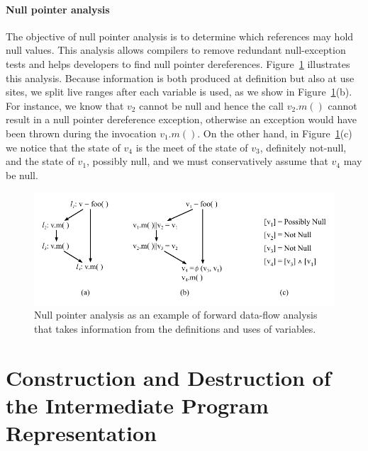 \paragraph{Null pointer analysis} The objective of null pointer analysis is to determine which references may hold null values.
This analysis allows compilers to remove redundant null-exception tests and helps developers to find null pointer dereferences.
Figure~\ref{fig:ssi:nullAnalysis} illustrates this analysis.
Because information is both produced at definition but also at use sites, we split live ranges after each variable is used, as we show in Figure~\ref{fig:ssi:nullAnalysis}(b).
For instance, we know that $v_2$ cannot be null and hence the call $v_2.m()$ cannot result in a null pointer dereference exception, otherwise an exception would have been thrown during the invocation $v_1.m()$.
On the other hand, in Figure~\ref{fig:ssi:nullAnalysis}(c) we notice that the state of $v_4$ is the meet of the state of $v_3$, definitely not-null, and the state of $v_1$, possibly null, and we must conservatively assume that $v_4$ may be null.


\begin{figure}[t!]
\centering
\includegraphics[width=\linewidth]{nullAnalysis}
\caption{Null pointer analysis as an example of forward data-flow analysis that takes information from the definitions and uses of variables.} \label{fig:ssi:nullAnalysis}
\end{figure}


\section{Construction and Destruction of the Intermediate Program Representation}
\label{sec:building}
\def\Sdown{\downarrow}
\def\Sup{\uparrow}
\def\SS{{\cal P}}
\def\Out{\mathrm{Out}}
\def\In{\mathrm{In}}
\def\Defs{\mathrm{Defs}}
\def\Def{\mathrm{Def}}
\def\Uses{\mathrm{Uses}}

